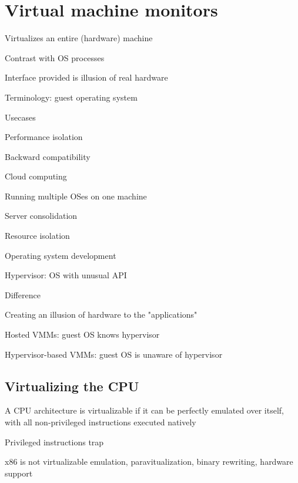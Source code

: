\section{Virtual machine monitors}
\enumstart
	\item Virtualizes an entire (hardware) machine
	\enumstart
		\item Contrast with OS processes
		\item Interface provided is illusion of real hardware
		\item Terminology: guest operating system
	\enumend
	\item Usecases
	\enumstart
		\item Performance isolation
		\item Backward compatibility
		\item Cloud computing
		\item Running multiple OSes on one machine
		\item Server consolidation
		\item Resource isolation
		\item Operating system development
	\enumend
	\item Hypervisor: OS with unusual API
	\enumstart
		\item Difference
		\enumstart
			\item Creating an illusion of hardware to the "applications"
		\enumend
		\item Hosted VMMs: guest OS knows hypervisor
		\item Hypervisor-based VMMs: guest OS is unaware of hypervisor
	\enumend
\enumend

\subsection{Virtualizing the CPU}
\enumstart
	\item A CPU architecture is virtualizable if it can be perfectly emulated over itself, with all non-privileged instructions executed natively
	\item Privileged instructions \arrow trap
	\item x86 is not virtualizable \arrow emulation, paravitualization, binary rewriting, hardware support
\enumend

